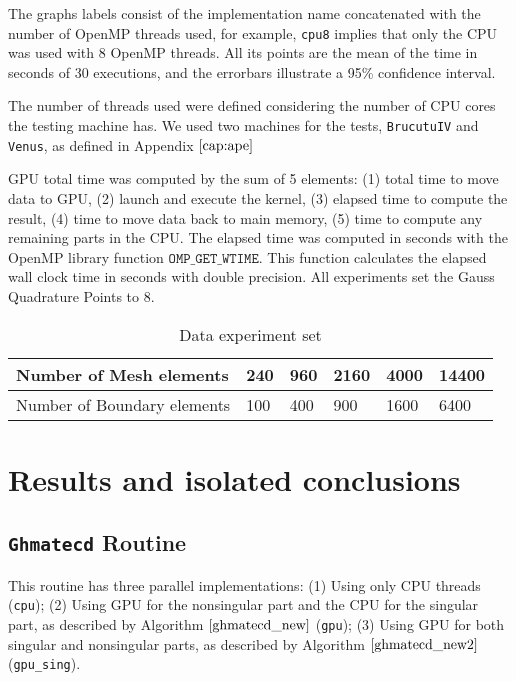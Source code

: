 The graphs labels consist of the implementation name concatenated with the number of OpenMP threads used, 
for example, \texttt{cpu8} implies that only the CPU was used with 8 OpenMP threads. All its points 
are the mean of the time in seconds of 30 executions, and the errorbars illustrate a 95\% confidence interval.

The number of threads used were defined considering the number of CPU cores the testing machine has. 
We used two machines for the tests, \texttt{BrucutuIV} and \texttt{Venus}, as defined in Appendix $\ref{cap:ape}$

GPU total time was computed by the sum of 5 elements: 
(1) total time to move data to GPU, (2) launch and execute the kernel, (3) elapsed time 
to compute the result, (4) time to move data back to main memory, (5) time to compute 
any remaining parts in the CPU. 
The elapsed time was computed in seconds with the OpenMP library function 
$\texttt{OMP\_GET\_WTIME}$. This function calculates the elapsed wall clock time in seconds 
with double precision. All experiments set the Gauss Quadrature Points to 8.

\begin{table}[]
\centering
\caption{Data experiment set}
\label{experiments}
\begin{tabular}{|l|l|l|l|l|l|}
\hline
Number of Mesh elements     & 240 & 960 & 2160 & 4000 & 14400\\ \hline
Number of Boundary elements & 100 & 400 & 900  & 1600 & 6400\\ \hline
\end{tabular}
\end{table}

\section{Results and isolated conclusions}

\subsection{\texttt{Ghmatecd} Routine}

This routine has three parallel implementations: (1) Using only CPU threads 
(\texttt{cpu}); (2) Using GPU for the nonsingular part and the CPU for the 
singular part, as described by Algorithm $\ref{ghmatecd_new}$ (\texttt{gpu}); 
(3) Using GPU for both singular and nonsingular parts, as described by Algorithm 
$\ref{ghmatecd_new2}$ (\texttt{gpu\_sing}).                                    

